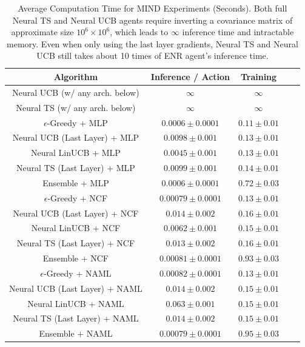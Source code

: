 \begin{table}[t!]
\small
  \caption{Average Computation Time for MIND Experiments (Seconds). Both full Neural TS and Neural UCB agents require inverting a covariance matrix of approximate size $10^{6} \times 10^{6}$, which leads to $\infty$ inference time and intractable memory. Even when only using the last layer gradients, Neural TS and Neural UCB still takes about 10 times of ENR agent's inference time.}
  \vspace{-0.1in}
  \label{tab:mind_comp}
  \begin{tabular}{ccccc}
    \toprule
    Algorithm & Inference / Action & Training\\
    \midrule 
    Neural UCB (w/ any arch. below) & $\infty$ & $\infty$\\
    Neural TS (w/ any arch. below) & $\infty$ & $\infty$\\
    \midrule
    $\epsilon$-Greedy + MLP  & $0.0006 \pm 0.0001$ & $0.11 \pm 0.01$\\
    Neural UCB (Last Layer) + MLP & $0.0098 \pm 0.001$ & $0.13 \pm 0.01$\\
    Neural LinUCB + MLP & $0.0045 \pm 0.001$ & $0.13 \pm 0.01$\\
    Neural TS (Last Layer) + MLP & $0.0099 \pm 0.001$ & $0.14 \pm 0.01$\\
    Ensemble + MLP & $0.0006 \pm 0.0001$ & $0.72 \pm 0.03$\\

    \midrule

    $\epsilon$-Greedy + NCF & $0.00079 \pm 0.0001$ & $0.13 \pm 0.01$\\
    Neural UCB (Last Layer) + NCF & $0.014 \pm 0.002$ & $0.16 \pm 0.01$\\
    Neural LinUCB + NCF & $0.0062 \pm 0.001$ & $0.15 \pm 0.01$\\
    Neural TS (Last Layer) + NCF & $0.013 \pm 0.002$ & $0.16 \pm 0.01$\\
    Ensemble + NCF & $0.00081 \pm 0.0001$ & $0.93 \pm 0.03$\\

    \midrule
    
    $\epsilon$-Greedy + NAML & $0.00082 \pm 0.0001$ & $0.13 \pm 0.01$\\
    Neural UCB (Last Layer) + NAML &$0.014 \pm 0.002$ & $0.15 \pm 0.01$\\
    Neural LinUCB + NAML &$0.063 \pm 0.001$ & $0.15 \pm 0.01$\\
    Neural TS (Last Layer) + NAML & $0.014 \pm 0.002$ & $0.15 \pm 0.01$\\
    Ensemble + NAML & $0.00079 \pm 0.0001$ & $0.95 \pm 0.03$\\


\end{tabular}
\end{table}

